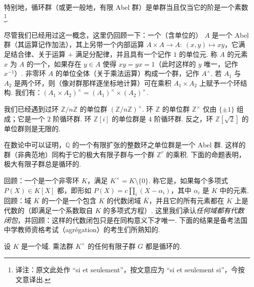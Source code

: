 特别地，循环群（或更一般地，有限 Abel 群）是单群当且仅当它的阶是一个素数\footnote{译注：原文此处作 ``si et seulement''，按文意应为 ``si et seulement si''，今按文意译出.}.

\begin{numpara}[单位群]\label{np:fg-1-2-2}
尽管我们已经用过这一概念，这里仍回顾一下：一个（含单位的） $A$ 是一个 Abel 群（其运算记作加法），其上另带一个内部运算 $A\times A\to A:\ (x,y)\mapsto xy$，它满足结合律、关于运算 $+$ 满足分配律，并且具有一个记作 $1$ 的单位元. 称 $A$ 的元素 $x$ 为 $A$ 的一个，如果存在 $y\in A$ 使得 $xy=yx=1$（此时这样的 $y$ 唯一，记作 $x^{-1}$）. 非零环 $A$ 的单位全体（关于乘法运算）构成一个群，记作 $A^\times$. 若 $A_1$ 与 $A_2$ 是两个环，则（像对群那样逐坐标地计算）可在乘积 $A_1\times A_2$ 上赋予一个环结构. 我们有：$(A_1\times A_2)^\times=(A_1)^\times\times(A_2)^\times$.

我们已经遇到过环 $\mathbb{Z}/n\mathbb{Z}$ 的单位群 $(\mathbb{Z}/n\mathbb{Z})^\times$. 环 $\mathbb{Z}$ 的单位群 $\mathbb{Z}^\times$ 仅由 $\{\pm1\}$ 组成；它是一个 $2$ 阶循环群. 环 $\mathbb{Z}[i]$ 的单位群是 $4$ 阶循环群. 反之，环 $\mathbb{Z}[\sqrt{2}]$ 的单位群则是无限的.
\end{numpara}

\begin{remark*}
在数论中可以证明，$\mathbb{Q}$ 的一个有限扩张的整数环之单位群是一个 Abel 群. 这样的群（非典范地）同构于它的极大有限子群与一个群 $\mathbb{Z}^r$ 的乘积. 下面的命题表明，极大有限子群总是循环的.
\end{remark*}

回顾：一个是一个非零环 $K$，满足 $K^\times=K\setminus\{0\}$. 称它是，如果每个多项式 $P(X)\in K[X]$ 都，即形如 $P(X)=c\prod_i(X-\alpha_i)$，其中 $\alpha_i$ 是 $K$ 中的元素. 回顾：域 $K$ 的一个是一个包含 $K$ 的代数闭域 $\bar{K}$，并且它的所有元素都在 $K$ 上是代数的（即满足一个系数取自 $K$ 的多项式方程）. 这里我们承认\emph{任何域都有代数闭包}，并回顾：这样的代数闭包只是在同构意义下才唯一.
下面的结果是备考法国中学教师资格考试（agrégation）的考生们所熟知的.

\begin{proposition*}
设 $K$ 是一个域. 乘法群 $K^\times$ 的任何有限子群 $G$ 都是循环的.
\end{proposition*}

